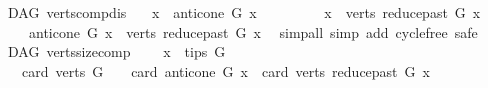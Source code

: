 \begin{isabellebody}
\ {\isacharparenleft}{\kern0pt}\ DAG{\isacharparenright}{\kern0pt}\ verts{\isacharunderscore}{\kern0pt}comp{\isacharunderscore}{\kern0pt}dis{\isacharcolon}{\kern0pt}\isanewline
\ \ \ {\isachardoublequoteopen}{\isacharbraceleft}{\kern0pt}x{\isacharbraceright}{\kern0pt}\ {\isasyminter}\ {\isacharparenleft}{\kern0pt}anticone\ G\ x{\isacharparenright}{\kern0pt}\ {\isacharequal}{\kern0pt}\ {\isacharbraceleft}{\kern0pt}{\isacharbraceright}{\kern0pt}{\isachardoublequoteclose}\ \isanewline
\ \ \ \ \ {\isachardoublequoteopen}\ {\isacharbraceleft}{\kern0pt}x{\isacharbraceright}{\kern0pt}\ {\isasyminter}\ {\isacharparenleft}{\kern0pt}verts\ {\isacharparenleft}{\kern0pt}reduce{\isacharunderscore}{\kern0pt}past\ G\ x{\isacharparenright}{\kern0pt}{\isacharparenright}{\kern0pt}\ {\isacharequal}{\kern0pt}\ {\isacharbraceleft}{\kern0pt}{\isacharbraceright}{\kern0pt}{\isachardoublequoteclose}\isanewline
\ \ \ \ \ {\isachardoublequoteopen}anticone\ G\ x\ {\isasyminter}\ {\isacharparenleft}{\kern0pt}verts\ {\isacharparenleft}{\kern0pt}reduce{\isacharunderscore}{\kern0pt}past\ G\ x{\isacharparenright}{\kern0pt}{\isacharparenright}{\kern0pt}\ {\isacharequal}{\kern0pt}\ {\isacharbraceleft}{\kern0pt}{\isacharbraceright}{\kern0pt}{\isachardoublequoteclose}\isanewline
%
\isadelimproof
%
\endisadelimproof
%
\isatagproof
{}\isamarkupfalse%
{\isacharparenleft}{\kern0pt}simp{\isacharunderscore}{\kern0pt}all{\isacharcomma}{\kern0pt}\ simp\ add{\isacharcolon}{\kern0pt}\ cycle{\isacharunderscore}{\kern0pt}free{\isacharcomma}{\kern0pt}\ safe{\isacharparenright}{\kern0pt}\ \isamarkupfalse%
%
\endisatagproof
{\isafoldproof}%
%
\isadelimproof
\isanewline
%
\endisadelimproof
\isanewline
\isanewline
{}\isamarkupfalse%
\ {\isacharparenleft}{\kern0pt}\ DAG{\isacharparenright}{\kern0pt}\ verts{\isacharunderscore}{\kern0pt}size{\isacharunderscore}{\kern0pt}comp{\isacharcolon}{\kern0pt}\isanewline
\ \ \ \ {\isachardoublequoteopen}x\ {\isasymin}\ tips\ G{\isachardoublequoteclose}\isanewline
\ \ \ \ {\isachardoublequoteopen}card\ {\isacharparenleft}{\kern0pt}verts\ G{\isacharparenright}{\kern0pt}\ {\isacharequal}{\kern0pt}\ {}\ {\isacharplus}{\kern0pt}\ card\ {\isacharparenleft}{\kern0pt}anticone\ G\ x{\isacharparenright}{\kern0pt}\ {\isacharplus}{\kern0pt}\ card\ {\isacharparenleft}{\kern0pt}verts\ {\isacharparenleft}{\kern0pt}reduce{\isacharunderscore}{\kern0pt}past\ G\ x{\isacharparenright}{\kern0pt}{\isacharparenright}{\kern0pt}{\isachardoublequoteclose}\isanewline

\end{isabellebody}
